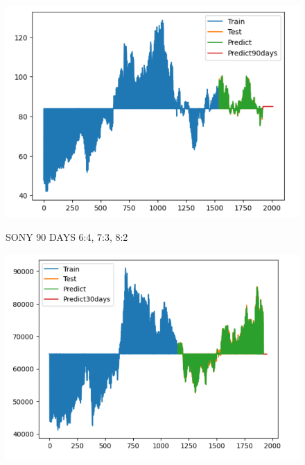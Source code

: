 \documentclass{article}
\begin{document}
\begin{multicols}{2}
\begin{figure}[H]
\begin{minipage}{0.15\textwidth}
    \label{fig:2}
    \end{minipage}%
    \begin{minipage}{0.15\textwidth}
    \centering
    \includegraphics[width=1\textwidth]{Image/GradientBoosting/SONY_90_8_2_GradientBoostingRegressor.png}

    \label{fig:3}
    \end{minipage}
    \caption{SONY 90 DAYS  6:4, 7:3, 8:2 }
\end{figure}


\begin{figure}[H]
    \centering
    \begin{minipage}{0.15\textwidth}
    \centering
    \includegraphics[width=1\textwidth]{Image/GradientBoosting/SAMSUNG_30_6_4_GradientBoostingRegressor.png}
   

\end{minipage}
\end{figure}
\end{multicols}
\end{document}
